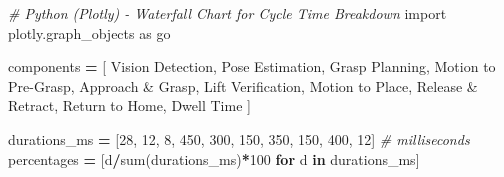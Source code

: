 \documentclass[
]{article}
\newenvironment{Shaded}{\begin{snugshade}}{\end{snugshade}}
\newcommand{\BuiltInTok}[1]{#1}
\newcommand{\CommentTok}[1]{\textcolor[rgb]{0.56,0.35,0.01}{\textit{#1}}}
\newcommand{\ControlFlowTok}[1]{\textcolor[rgb]{0.13,0.29,0.53}{\textbf{#1}}}
\newcommand{\DecValTok}[1]{\textcolor[rgb]{0.00,0.00,0.81}{#1}}
\newcommand{\ImportTok}[1]{#1}
\newcommand{\KeywordTok}[1]{\textcolor[rgb]{0.13,0.29,0.53}{\textbf{#1}}}
\newcommand{\NormalTok}[1]{#1}
\newcommand{\OperatorTok}[1]{\textcolor[rgb]{0.81,0.36,0.00}{\textbf{#1}}}
\newcommand{\StringTok}[1]{\textcolor[rgb]{0.31,0.60,0.02}{#1}}
\begin{document}
\begin{Shaded}
\begin{Highlighting}[]
\CommentTok{\# Python (Plotly) {-} Waterfall Chart for Cycle Time Breakdown}
\ImportTok{import}\NormalTok{ plotly.graph\_objects }\ImportTok{as}\NormalTok{ go}

\NormalTok{components }\OperatorTok{=}\NormalTok{ [}
    \StringTok{\textquotesingle{}Vision Detection\textquotesingle{}}\NormalTok{, }\StringTok{\textquotesingle{}Pose Estimation\textquotesingle{}}\NormalTok{, }\StringTok{\textquotesingle{}Grasp Planning\textquotesingle{}}\NormalTok{,}
    \StringTok{\textquotesingle{}Motion to Pre{-}Grasp\textquotesingle{}}\NormalTok{, }\StringTok{\textquotesingle{}Approach \& Grasp\textquotesingle{}}\NormalTok{, }\StringTok{\textquotesingle{}Lift Verification\textquotesingle{}}\NormalTok{,}
    \StringTok{\textquotesingle{}Motion to Place\textquotesingle{}}\NormalTok{, }\StringTok{\textquotesingle{}Release \& Retract\textquotesingle{}}\NormalTok{, }\StringTok{\textquotesingle{}Return to Home\textquotesingle{}}\NormalTok{, }\StringTok{\textquotesingle{}Dwell Time\textquotesingle{}}
\NormalTok{]}

\NormalTok{durations\_ms }\OperatorTok{=}\NormalTok{ [}\DecValTok{28}\NormalTok{, }\DecValTok{12}\NormalTok{, }\DecValTok{8}\NormalTok{, }\DecValTok{450}\NormalTok{, }\DecValTok{300}\NormalTok{, }\DecValTok{150}\NormalTok{, }\DecValTok{350}\NormalTok{, }\DecValTok{150}\NormalTok{, }\DecValTok{400}\NormalTok{, }\DecValTok{12}\NormalTok{]  }\CommentTok{\# milliseconds}
\NormalTok{percentages }\OperatorTok{=}\NormalTok{ [d}\OperatorTok{/}\BuiltInTok{sum}\NormalTok{(durations\_ms)}\OperatorTok{*}\DecValTok{100} \ControlFlowTok{for}\NormalTok{ d }\KeywordTok{in}\NormalTok{ durations\_ms]}


\end{Highlighting}
\end{Shaded}
\end{document}
